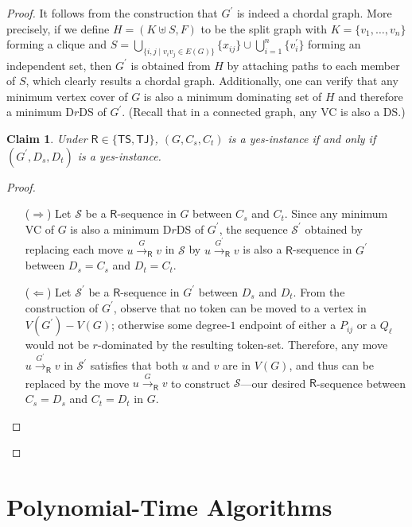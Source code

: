\documentclass[a4paper]{article}
\theoremstyle{plain}
\newtheorem{claim}{Claim}[theorem]
\theoremstyle{definition}
\newcommand{\sfTS}{{\mathsf{TS}}} %
\newcommand{\sfTJ}{{\mathsf{TJ}}} %
\newcommand{\sfR}{{\mathsf{R}}} %
\newcommand{\calS}{{\mathcal{S}}}
\newcommand{\reconf}[2][\sfR]{\overset{#2}{\longrightarrow}_{#1}} %
\begin{document}
\begin{proof}
	It follows from the construction that $G^\prime$ is indeed a chordal graph.
	More precisely, if we define $H = (K \uplus S, F)$ to be the split graph with $K = \{v_1, \dots, v_n\}$ forming a clique and $S = \bigcup_{\{i, j \mid v_iv_j \in E(G)\}}\{x_{ij}\} \cup \bigcup_{i=1}^n\{v^\prime_i\}$ forming an independent set, then $G^\prime$ is obtained from $H$ by attaching paths to each member of $S$, which clearly results a chordal graph.
	Additionally, one can verify that any minimum vertex cover of $G$ is also a minimum dominating set of $H$ and therefore a minimum D$r$DS of $G^\prime$.
	(Recall that in a connected graph, any VC is also a DS.)
	
	\begin{claim}\label{clm:chordal}
		Under $\sfR \in \{\sfTS, \sfTJ\}$, $(G, C_s, C_t)$  is a yes-instance if and only if $(G^\prime, D_s, D_t)$ is a yes-instance.
	\end{claim} 
	\begin{proof}
		\begin{itemize}
			\item[($\Rightarrow$)] Let $\calS$ be a $\sfR$-sequence in $G$ between $C_s$ and $C_t$.
			Since any minimum VC of $G$ is also a minimum D$r$DS of $G^\prime$, the sequence $\calS^\prime$ obtained by replacing each move $u \reconf[\sfR]{G} v$ in $\calS$ by $u \reconf[\sfR]{G^\prime} v$ is also a $\sfR$-sequence in $G^\prime$ between $D_s = C_s$ and $D_t = C_t$.
			
			\item[($\Leftarrow$)] Let $\calS^\prime$ be a $\sfR$-sequence in $G^\prime$ between $D_s$ and $D_t$.
			From the construction of $G^\prime$, observe that no token can be moved to a vertex in $V(G^\prime) - V(G)$; otherwise some degree-$1$ endpoint of either a $P_{ij}$ or a $Q_\ell$ would not be $r$-dominated by the resulting token-set.
			Therefore, any move $u \reconf[\sfR]{G^\prime} v$ in $\calS^\prime$ satisfies that both $u$ and $v$ are in $V(G)$, and thus can be replaced by the move $u \reconf[\sfR]{G} v$ to construct $\calS$---our desired $\sfR$-sequence between $C_s = D_s$ and $C_t = D_t$ in $G$.
		\end{itemize}
	\end{proof}
\end{proof}

\section{Polynomial-Time Algorithms}
\label{sec:polytime}
\end{document}
